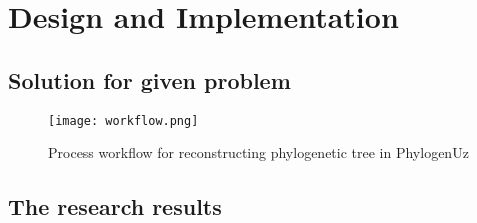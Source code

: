 \chapter{Design and Implementation}

\section{Solution for given problem}

\begin{figure}[!htbp] 
  \center
  \texttt{[image: workflow.png]}
  \caption[w]{Process workflow for reconstructing 
  phylogenetic tree in PhylogenUz} 
  \label{img:workflow1}  
\end{figure}

\section{The research results}

\newpage